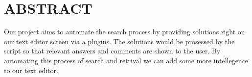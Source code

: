 \chapter*{\uppercase{ABSTRACT}}
Our project aims to automate the search process by
providing solutions right on our text editor screen via a plugins. The
solutions would be prosessed by the script so that relevant answers
and comments are shown to the user. By automating this process of
search and retrival we can add some more intellegence to our text
editor.

